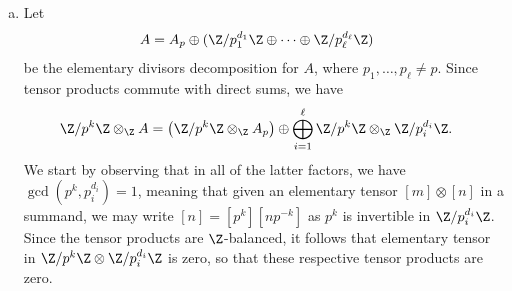 \documentclass[10pt]{mypackage}
\begin{document}
\begin{solution}\hfill
  \begin{enumerate}[(a)]
    \item Let
      \begin{align*}
        A &= A_p \oplus ( \Z/p_1^{d_1}\Z\oplus\cdots\oplus \Z/p_{\ell}^{d_{\ell}}\Z )
      \end{align*}
      be the elementary divisors decomposition for $A$, where $p_1,\dots,p_{\ell}\neq p$. Since tensor products commute with direct sums, we have
      \begin{align*}
        \Z/p^{k}\Z\otimes_{\Z}A &= \left( \Z/p^{k}\Z\otimes_{\Z}A_p \right) \oplus \bigoplus_{i=1}^{\ell}\Z/p^k\Z\otimes_{\Z}\Z/p_i^{d_i}\Z.
      \end{align*}
      We start by observing that in all of the latter factors, we have $\gcd\left( p^{k},p_i^{d_i} \right) = 1$, meaning that given an elementary tensor $\left[ m \right]\otimes \left[ n \right]$ in a summand, we may write $\left[ n \right] = \left[ p^{k} \right]\left[ n p^{-k} \right]$ as $p^{k}$ is invertible in $\Z/p_i^{d_i}\Z$. Since the tensor products are $\Z$-balanced, it follows that elementary tensor in $\Z/p^{k}\Z\otimes \Z/p_i^{d_i}\Z$ is zero, so that these respective tensor products are zero.


\end{enumerate}
\end{solution}
\end{document}
